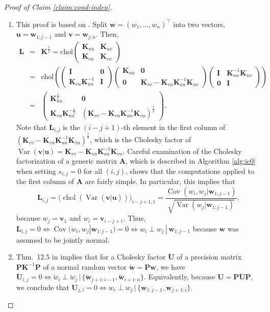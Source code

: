 \documentclass[12pt,letterpaper]{article}
\theoremstyle{propstyle}
\theoremstyle{propstyle}
\theoremstyle{propstyle}
\theoremstyle{propstyle}
\theoremstyle{propstyle}
\newcommand{\bu}{\mathbf{u}}
\newcommand{\bv}{\mathbf{v}}
\newcommand{\bw}{\mathbf{w}}
\newcommand{\bP}{\mathbf{P}}
\newcommand{\bA}{\mathbf{A}}
\newcommand{\bL}{\mathbf{L}}
\newcommand{\bI}{\mathbf{I}}
\newcommand{\bU}{\mathbf{U}}
\newcommand{\bK}{\mathbf{K}}
\newcommand{\bfzero}{\mathbf{0}}
\DeclareMathOperator*{\var}{Var}
\DeclareMathOperator*{\cov}{Cov}
\DeclareMathOperator*{\chol}{chol}
\begin{document}
\begin{proof}[Proof of Claim \ref{claim:cond-indep}]
~~ \\ \vspace{-5mm}
    \begin{enumerate}
        \item This proof is based on \citet[][Sect.~3.2]{Schafer2017}. Split $\bw = (w_1,\ldots,w_n)^\top$ into two vectors, $\bu=\bw_{1:j-1}$ and $\bv=\bw_{j:n}$. Then,
\begin{eqnarray*}
\bL & = & \bK^{\frac{1}{2}} = \text{chol}\left( \begin{array}{cc} \bK_{uu} & \bK_{uv} \\ \bK_{vu} & \bK_{vv} \end{array}\right) \\
 & = & \text{chol}\left( \left(\begin{array}{cc} \bI & \bfzero \\ \bK_{vu}\bK_{uu}^{-1} & \bI \end{array}\right) \left(\begin{array}{cc} \bK_{uu} & \bfzero \\ \bfzero & \bK_{vv} - \bK_{vu}\bK_{uu}^{-1}\bK_{uv} \end{array}\right) \left(\begin{array}{cc} \bI & \bK_{uu}^{-1}\bK_{uv} \\ \bfzero & \bI \end{array}\right)  \right) \\
& = & \left(\begin{array}{cc} \bK_{uu}^\frac{1}{2} & \bfzero \\ 
\bK_{vu}\bK_{uu}^{-\frac{1}{2}} & \left( \bK_{vv} - \bK_{vu}\bK^{-1}_{uu} \bK_{vu}\right)^\frac{1}{2}\end{array}\right). \label{eq:blockchol}
\end{eqnarray*}
Note that $\bL_{i,j}$ is the $(i-j+1)$-th element in the first column of $\left( \bK_{vv} - \bK_{vu}\bK^{-1}_{uu} \bK_{vu}\right)^\frac{1}{2}$, which is the Cholesky factor of $\var(\bv|\bu) = \bK_{vv} - \bK_{vu}\bK^{-1}_{uu} \bK_{vu}$. Careful examination of the Cholesky factorization of a generic matrix $\bA$, which is described in Algorithm \ref{alg:ic0} when setting $s_{i,j}=0$ for all $(i,j)$, shows that the computations applied to the first column of $\bA$ are fairly simple. In particular, this implies that 
\[
\bL_{i,j} = \big(\chol(\var(\bv|\bu))\big)_{i-j+1,1} =  \frac{\cov(w_i,w_j|\bw_{1:j-1})}{\sqrt{\var(w_j|\bw_{1:j-1})}},
\]
because $w_j = \bv_1$ and $w_i = \bv_{i-j+1}$. Thus, $\bL_{i,j}=0 \iff \cov(w_i,w_j|\bw_{1:j-1})=0 \iff w_i \perp w_j \, | \, \bw_{1:j-1}$ because $\bw$ was assumed to be jointly normal.
    \item Thm.~12.5 in \citet{Rue2010} implies that for a Cholesky factor $\breve{\bU}$ of a precision matrix $\bP\bK^{-1}\bP$ of a normal random vector $\breve{\bw} = \bP\bw$, we have $\breve{\bU}_{i,j}=0 \iff \breve{w}_i \perp \breve{w}_j \,|\, \{\breve{\bw}_{j+1:i-1}, \breve{\bw}_{i+1:n}\}$. Equivalently, because $\bU = \bP\breve{\bU}\bP$, we conclude that $\bU_{j,i}=0 \iff w_i \perp w_j \,|\, \{\bw_{1:j-1}, \bw_{j+1:i}\}$.
    \end{enumerate}
\end{proof}
\end{document}
